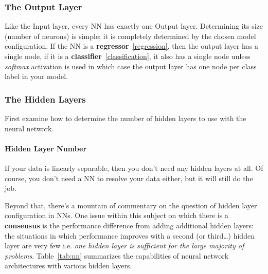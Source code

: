 \subsubsection*{The Output Layer}

Like the Input layer, every NN has exactly one Output layer. Determining its size (number of neurons) is simple; it is completely determined by the chosen model configuration.
If the NN is a \textbf{regressor}~\ref{regression}, then the output layer has a single node, if it is a \textbf{classifier}~\ref{classification}, it also has a single node unless \emph{softmax} activation is used in which case the output layer has one node per class label in your model.

\subsubsection*{The Hidden Layers}

First examine how to determine the number of hidden layers to use with the neural network.

\paragraph{Hidden Layer Number}
If your data is linearly separable, then you don't need any hidden layers at all. Of course, you don't need a NN to resolve your data either, but it will still do the job.

Beyond that, there's a mountain of commentary on the question of hidden layer configuration in NNs. One issue within this subject on which there is a \textbf{consensus} is the performance difference from adding additional hidden layers: the situations in which performance improves with a second (or third\ldots) hidden layer are very few i.e. \emph{one hidden layer is sufficient for the large majority of problems}. Table~\ref{tab:nn} summarizes the capabilities of neural network architectures with various hidden layers.

